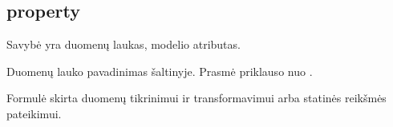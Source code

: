 \documentclass[letterpaper,10pt,lithuanian]{sphinxmanual}
\begin{document}
\subsection{property}
\label{\detokenize{dimensijos:property}}\label{\detokenize{dimensijos:id7}}\label{\detokenize{dimensijos:module-property}}
\sphinxAtStartPar
Savybė yra duomenų laukas, modelio atributas.

\begin{fulllineitems}
\label{\detokenize{dimensijos:property.source}}
\pysigstartsignatures
{}
\pysigstopsignatures
\sphinxAtStartPar
Duomenų lauko pavadinimas šaltinyje. Prasmė priklauso nuo
{\hyperref[\detokenize{dimensijos:resource.type}]{}}.

\end{fulllineitems}


\begin{fulllineitems}
\label{\detokenize{dimensijos:property.prepare}}
\pysigstartsignatures
{}
\pysigstopsignatures
\sphinxAtStartPar
Formulė skirta duomenų tikrinimui ir transformavimui arba statinės reikšmės
pateikimui.

\end{fulllineitems}

\end{document}
